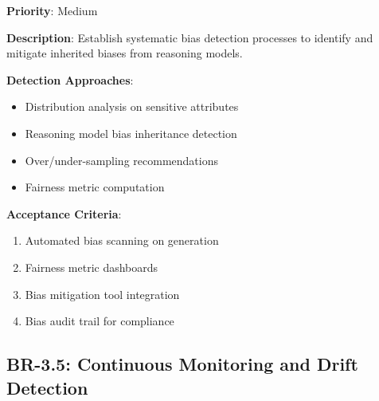 \documentclass[12pt,a4paper,twoside]{report}
\begin{document}
\begin{tcolorbox}[colback=yellow!5,colframe=yellow!70,title=BR-3.4: Systematic Bias Detection]
\textbf{Priority}: Medium

\textbf{Description}: Establish systematic bias detection processes to identify
and mitigate inherited biases from reasoning models.

\textbf{Detection Approaches}:
\begin{itemize}
\item Distribution analysis on sensitive attributes
\item Reasoning model bias inheritance detection
\item Over/under-sampling recommendations
\item Fairness metric computation
\end{itemize}

\textbf{Acceptance Criteria}:
\begin{enumerate}
\item Automated bias scanning on generation
\item Fairness metric dashboards
\item Bias mitigation tool integration
\item Bias audit trail for compliance
\end{enumerate}
\end{tcolorbox}

\subsection{BR-3.5: Continuous Monitoring and Drift Detection}
\end{document}
